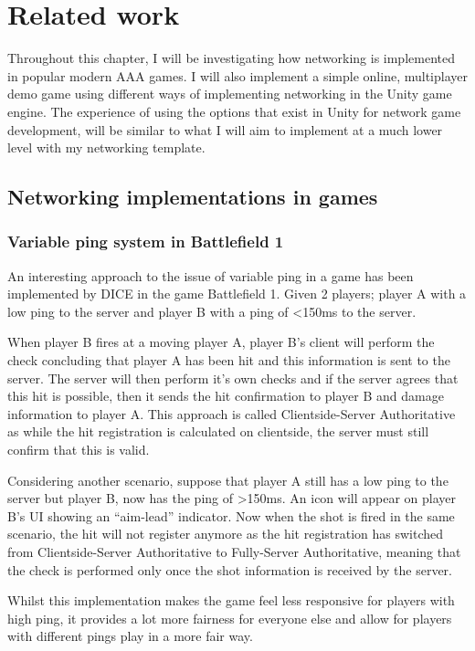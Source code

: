 


\chapter{Related work}
Throughout this chapter, I will be investigating how networking is implemented in popular modern AAA games. I will also implement a simple online, multiplayer demo game using different ways of implementing networking in the Unity game engine. The experience of using the options that exist in Unity for network game development, will be similar to what I will aim to implement at a much lower level with my networking template.

\section{Networking implementations in games}

\subsection{Variable ping system in Battlefield 1} \label{sec:bf1_ping}
An interesting approach to the issue of variable ping in a game has been implemented by DICE in the game Battlefield 1. Given 2 players; player A with a low ping to the server and player B with a ping of <150ms to the server.

When player B fires at a moving player A, player B's client will perform the check concluding that player A has been hit and this information is sent to the server. The server will then perform it's own checks and if the server agrees that this hit is possible, then it sends the hit confirmation to player B and damage information to player A. This approach is called Clientside-Server Authoritative as while the hit registration is calculated on clientside, the server must still confirm that this is valid.

Considering another scenario, suppose that player A still has a low ping to the server but player B, now has the ping of >150ms. An icon will appear on player B's UI showing an ``aim-lead'' indicator. Now when the shot is fired in the same scenario, the hit will not register anymore as the hit registration has switched from Clientside-Server Authoritative to Fully-Server Authoritative, meaning that the check is performed only once the shot information is received by the server.

Whilst this implementation makes the game feel less responsive for players with high ping, it provides a lot more fairness for everyone else and allow for players with different pings play in a more fair way.



